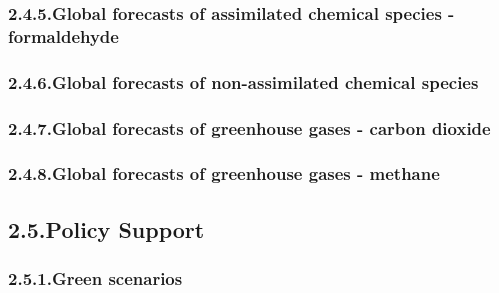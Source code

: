 \documentclass[9pt]{report}
\begin{document}
\subsubsection{2.4.5.\hspace*{0.5em}Global forecasts of assimilated chemical species - formaldehyde}\label{sec-global-forecasts-of-assimilated-chemical-species---formaldehyde}%

\subsubsection{2.4.6.\hspace*{0.5em}Global forecasts of non-assimilated chemical species}\label{sec-global-forecasts-of-non-assimilated-chemical-species}%

\subsubsection{2.4.7.\hspace*{0.5em}Global forecasts of greenhouse gases - carbon dioxide}\label{sec-global-forecasts-of-greenhouse-gases---carbon-dioxide}%

\subsubsection{2.4.8.\hspace*{0.5em}Global forecasts of greenhouse gases - methane}\label{sec-global-forecasts-of-greenhouse-gases---methane}%

\subsection{2.5.\hspace*{0.5em}Policy Support}\label{sec-policy-support}%

\subsubsection{2.5.1.\hspace*{0.5em}Green scenarios}\label{sec-green-scenarios}%

\end{document}
